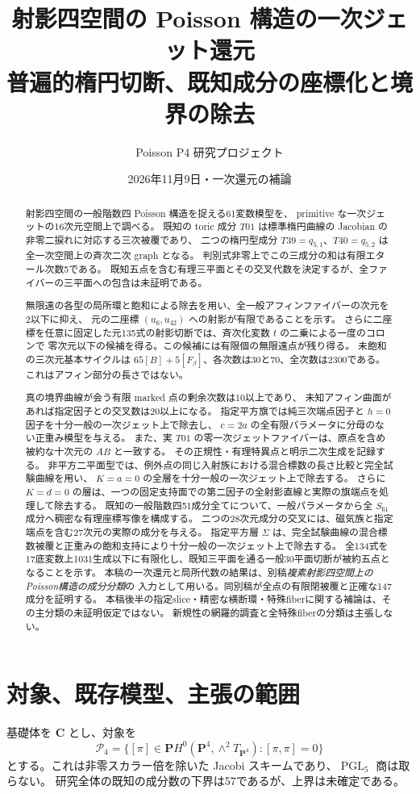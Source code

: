 \documentclass[11pt,a4paper]{ltjsarticle}
\title{射影四空間の Poisson 構造の一次ジェット還元\\
\large 普遍的楕円切断、既知成分の座標化と境界の除去}
\author{Poisson P4 研究プロジェクト}
\date{2026年11月9日・一次還元の補論}
\newcommand{\CC}{\mathbf C}
\newcommand{\PP}{\mathbf P}
\newcommand{\cP}{\mathcal P_4}
\DeclareMathOperator{\PGL}{PGL}
\theoremstyle{remark}
\begin{document}
\maketitle
\begin{abstract}
射影四空間の一般階数四 Poisson 構造を捉える61変数模型を、
primitive な一次ジェットの16次元空間上で調べる。
既知の toric 成分 $T01$ は標準楕円曲線の Jacobian の非零二捩れに対応する三次被覆であり、
二つの楕円型成分 $T39=q_{5,1}$、$T40=q_{5,2}$ は全一次空間上の斉次二次 graph となる。
判別式非零上でこの三成分の和は有限エタール次数5である。
既知五点を含む有理三平面とその交叉代数を決定するが、全ファイバーの三平面への包含は未証明である。

無限遠の各型の局所環と飽和による除去を用い、全一般アフィンファイバーの次元を2以下に抑え、
元の二座標 $(u_6,u_{42})$ への射影が有限であることを示す。
さらに二座標を任意に固定した元135式の射影切断では、斉次化変数 $t$ の二乗による一度のコロンで
零次元以下の候補を得る。この候補には有限個の無限遠点が残り得る。
未飽和の三次元基本サイクルは $65[B]+5[F_\beta]$、各次数は30と70、全次数は2300である。
これはアフィン部分の長さではない。

真の境界曲線が会う有限 marked 点の剰余次数は10以上であり、
未知アフィン曲面があれば指定因子との交叉数は20以上になる。
指定平方旗では純三次端点因子と $h=0$ 因子を十分一般の一次ジェット上で除去し、
$c=2a$ の全有限パラメータに分母のない正重み模型を与える。
また、実 $T01$ の零一次ジェットファイバーは、原点を含め被約な十次元の $AB$ と一致する。
その正規性・有理特異点と明示二次生成を記録する。
非平方二平面型では、例外点の同じ入射族における混合標数の長さ比較と完全試験曲線を用い、
$K=a=0$ の全層を十分一般の一次ジェット上で除去する。
さらに $K=d=0$ の層は、一つの固定支持面での第二因子の全射影直線と実際の旗端点を処理して除去する。
既知の一般階数四51成分全てについて、一般パラメータから全 $S_{61}$ 成分へ稠密な有理座標写像を構成する。
二つの28次元成分の交叉には、磁気族と指定端点を含む27次元の実際の成分を与える。
指定平方層 $\Sigma$ は、完全試験曲線の混合標数被覆と正重みの飽和支持により十分一般の一次ジェット上で除去する。
全134式を17底変数上1031生成以下に有限化し、既知三平面を通る一般30平面切断が被約五点となることを示す。
本稿の一次還元と局所代数の結果は、別稿\textit{複素射影四空間上のPoisson構造の成分分類}の
入力として用いる。同別稿が全点の有限閉被覆と正確な147成分を証明する。
本稿後半の指定slice・精密な横断環・特殊fiberに関する補論は、その主分類の未証明仮定ではない。
新規性の網羅的調査と全特殊fiberの分類は主張しない。
\end{abstract}

\section{対象、既存模型、主張の範囲}
基礎体を $\CC$ とし、対象を
\[
 \cP=\{[\pi]\in\PP H^0(\PP^4,\wedge^2T_{\PP^4}):[\pi,\pi]=0\}
\]
とする。これは非零スカラー倍を除いた Jacobi スキームであり、$\PGL_5$ 商は取らない。
研究全体の既知の成分数の下界は57であるが、上界は未確定である。
\end{document}
